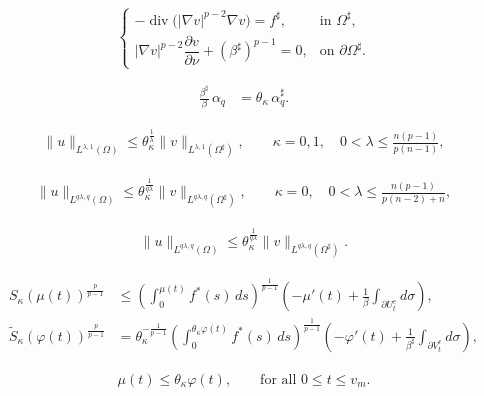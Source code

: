 \documentclass[10pt,a4paper]{amsart}
\begin{document}
\begin{equation}\label{eq:1.4}
\begin{cases}
-\operatorname{div}\bigl(|\nabla v|^{p-2}\nabla v\bigr)
=
f^\sharp,
& \text{in }\Omega^\sharp,
\\[1ex]
|\nabla v|^{p-2}
\dfrac{\partial v}{\partial\nu}
+
(\beta^\sharp)^{p-1}
=
0,
& \text{on }\partial\Omega^\sharp.
\end{cases}
\end{equation}

\begin{align}\label{eq:1.7}
\frac{\beta^\sharp}{\beta}\,\alpha_q
&=
\theta_\kappa\,\alpha_q^\sharp.
\end{align}

\begin{align}\label{eq:1.8}
\|u\|_{L^{\lambda,1}(\Omega)}
\le
\theta_\kappa^{\frac{1}{\lambda}}
\|v\|_{L^{\lambda,1}(\Omega^\sharp)},
\qquad
\kappa=0,1,
\quad
0 < \lambda \le \frac{n(p-1)}{p(n-1)},
\end{align}

\begin{align}\label{eq:1.9}
\|u\|_{L^{q\lambda,q}(\Omega)}
\le
\theta_\kappa^{\frac{1}{q\lambda}}
\|v\|_{L^{q\lambda,q}(\Omega^\sharp)},
\qquad
\kappa=0,
\quad
0 < \lambda \le \frac{n(p-1)}{p(n-2)+n},
\end{align}

\begin{align}\label{eq:1.11}
\|u\|_{L^{q\lambda,q}(\Omega)}
\le
\theta_\kappa^{\frac{1}{q\lambda}}
\|v\|_{L^{q\lambda,q}(\Omega^\sharp)}.
\end{align}

\begin{align}
S_\kappa(\mu(t))^{\frac{p}{p-1}}
&\le
\left(\int_0^{\mu(t)} f^*(s)\,ds\right)^\frac{1}{p-1}
\left(-\mu'(t)+\frac{1}{\beta}\int_{\partial U_t^e} d\sigma\right),
\label{eq:3.1}
\\
\tilde S_\kappa(\varphi(t))^\frac{p}{p-1}
&=
\theta_\kappa^{-\frac{1}{p-1}}
\left(\int_0^{\theta_\kappa \varphi(t)} f^*(s)\,ds\right)^{\frac{1}{p-1}}
\left(-\varphi'(t)+\frac{1}{\beta^\sharp}\int_{\partial V_t^e} d\sigma\right),
\label{eq:3.2}
\end{align}

\begin{align}\label{eq:3.3}
\mu(t) \le \theta_\kappa \varphi(t),
\qquad
\text{for all } 0\le t \le v_m.
\end{align}
\end{document}
